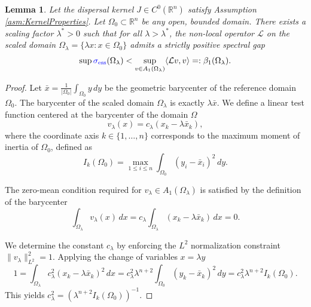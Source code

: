 \documentclass[12pt, a4paper]{article}
\newcommand{\revision}[1]{\textcolor{blue}{#1}}
\theoremstyle{break}
\theoremstyle{break}
\theoremstyle{break}
\theoremstyle{break}
\theoremstyle{break}
\newtheorem{lem}{Lemma}[section]
\theoremstyle{break}
\theoremstyle{break}
\theoremstyle{break}
\theoremstyle{break}
\begin{document}
\begin{lem}
    \label{lem:large_domain_gap}
    Let the dispersal kernel $J \in C^0(\mathbb{R}^n)$ satisfy Assumption \ref{asm:KernelProperties}. Let $\Omega_0 \subset \mathbb{R}^n$ be any open, bounded domain. There exists a scaling factor $\lambda^* > 0$ such that for all $\lambda > \lambda^*$, the non-local operator $\mathcal{L}$ on the scaled domain $\Omega_\lambda = \{ \lambda x : x \in \Omega_0 \}$ admits a strictly positive spectral gap
    \begin{equation}
        \sup \revision{\sigma_{\mathrm{ess}}}(\Omega_\lambda) < \sup_{v \in A_1(\Omega_\lambda)} \langle \mathcal{L}v, v \rangle =: \beta_1(\Omega_\lambda).
    \end{equation}
\end{lem}

\begin{proof}
    
    Let $\bar{x} = \frac{1}{|\Omega_0|} \int_{\Omega_0} y \, dy$ be the geometric barycenter of the reference domain $\Omega_0$. The barycenter of the scaled domain $\Omega_\lambda$ is exactly $\lambda \bar{x}$. We define a linear test function centered at the barycenter of the domain $\Omega$
    \begin{equation}
        v_\lambda(x) = c_\lambda (x_k - \lambda \bar{x}_k),
    \end{equation}
    where the coordinate axis $k \in \{1, \dots, n\}$ corresponds to the maximum moment of inertia of $\Omega_0$, defined as
    \begin{equation}
        I_k(\Omega_0) = \max_{1 \leq i \leq n} \int_{\Omega_0} (y_i - \bar{x}_i)^2 \, dy.
    \end{equation}
    
    The zero-mean condition required for $v_\lambda \in A_1(\Omega_\lambda)$ is satisfied by the definition of the barycenter
    \begin{equation}
        \int_{\Omega_\lambda} v_\lambda(x) \, dx = c_\lambda \int_{\Omega_\lambda} (x_k - \lambda \bar{x}_k) \, dx = 0.
    \end{equation}
    
    We determine the constant $c_\lambda$ by enforcing the $L^2$ normalization constraint $\|v_\lambda\|_{L^2}^2 = 1$. Applying the change of variables $x = \lambda y$
    \begin{equation}
        1 = \int_{\Omega_\lambda} c_\lambda^2 (x_k - \lambda \bar{x}_k)^2 \, dx = c_\lambda^2 \lambda^{n+2} \int_{\Omega_0} (y_k - \bar{x}_k)^2 \, dy = c_\lambda^2 \lambda^{n+2} I_k(\Omega_0).
    \end{equation}
    This yields $c_\lambda^2 = (\lambda^{n+2} I_k(\Omega_0))^{-1}$.
    

\end{proof}
\end{document}
